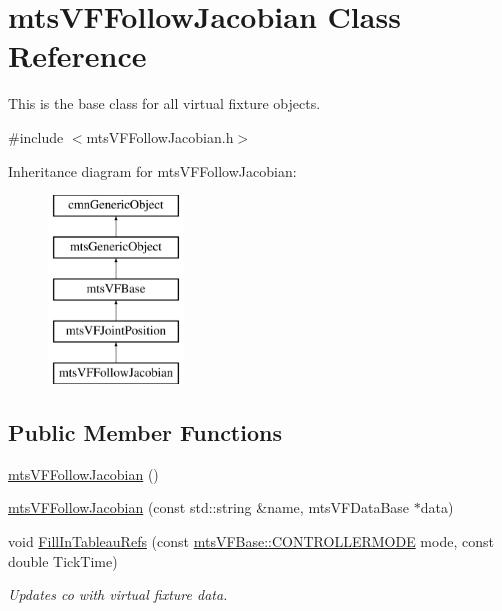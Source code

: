 \hypertarget{classmts_v_f_follow_jacobian}{}\section{mts\+V\+F\+Follow\+Jacobian Class Reference}
\label{classmts_v_f_follow_jacobian}


This is the base class for all virtual fixture objects.  




{\ttfamily \#include $<$mts\+V\+F\+Follow\+Jacobian.\+h$>$}

Inheritance diagram for mts\+V\+F\+Follow\+Jacobian\+:\begin{figure}[H]
\begin{center}
\leavevmode
\includegraphics[height=5.000000cm]{df/d4f/classmts_v_f_follow_jacobian}
\end{center}
\end{figure}
\subsection*{Public Member Functions}
\begin{DoxyCompactItemize}
\item 
\hyperlink{classmts_v_f_follow_jacobian_a69d8261e7ff157c4cd16b0710736bf5a}{mts\+V\+F\+Follow\+Jacobian} ()
\item 
\hyperlink{classmts_v_f_follow_jacobian_a9e103c7132fb2dcc77d2a35d497759af}{mts\+V\+F\+Follow\+Jacobian} (const std\+::string \&name, mts\+V\+F\+Data\+Base $\ast$data)
\item 
void \hyperlink{classmts_v_f_follow_jacobian_a710e3cf5407eccac61f7f1d3a80d9bca}{Fill\+In\+Tableau\+Refs} (const \hyperlink{classmts_v_f_base_a742dd08f8b70bafeb746cec14d9ee974}{mts\+V\+F\+Base\+::\+C\+O\+N\+T\+R\+O\+L\+L\+E\+R\+M\+O\+D\+E} mode, const double Tick\+Time)
\begin{DoxyCompactList}\small\item\em Updates co with virtual fixture data. \end{DoxyCompactList}\end{DoxyCompactItemize}
